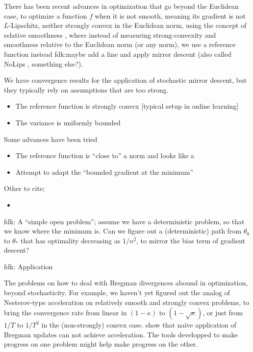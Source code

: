 \documentclass[twoside]{article}
\newcommand{\fdk}[1]{\textcolor{Periwinkle}{fdk:#1}}
\begin{document}
There has been recent advances in optimization that go beyond the Euclidean case, 
to optimize a function $f$ when it is not smooth, meaning its gradient is not $L$-Lipschitz,
neither strongly convex in the Euclidean norm, using the concept of relative smoothness 
\citep{bauschke2017descent,lu2018relatively},
where instead of measuring strong-convexity and smoothness relative to the Euclidean norm (or any norm), 
we use a reference function instead \fdk{maybe add a line}
and apply mirror descent \citep{nemirovski1983problem,beck2003mirror}
(also called NoLips \citep{bauschke2017descent}, something else?). 

We have convergence results for the 
application of stochastic mirror descent, 
but they typically rely on assumptions that are too strong. 
\begin{itemize}
	\item The reference function is strongly convex [typical setup in online learning]
	\item The variance is uniformly bounded
\end{itemize}
Some advances have been tried
\begin{itemize}
	\item The reference function is ``close to'' a norm
	and looks like a \citet{hanzely2018fastest}
	\item 
	Attempt to adapt the ``bounded gradient at the minimum''
	\citep{dragomir2021fast}
\end{itemize}

Other to cite;
\begin{itemize}
	\item \citet{marteauferey2019}
\end{itemize}


\fdk{
A ``simple open problem'';
assume we have a deterministic problem, so that we know where the minimum is. 
Can we figure out a (deterministic) path from $\theta_0$ to $\theta_*$ 
that has optimality decreasing as $1/n^2$, 
to mirror the bias term of gradient descent?
}


\fdk{
Application 

The problems on how to deal with Bregman divergences abound in optimization, beyond stochasticity. 
For example, we haven't yet figured out the analog of Nesterov-type acceleration 
on relatively smooth and strongly convex problems, 
to bring the convergence rate from linear in $(1-\kappa)$ to $(1-\sqrt{\kappa})$, 
or just from $1/T$ to $1/T^2$ 
in the (non-strongly) convex case.
\citet{dragomir2021optimal} show that naïve application of Bregman updates can not achieve acceleration.
The tools developped to make progress on one problem might help make progress on the other. 
}
\end{document}
